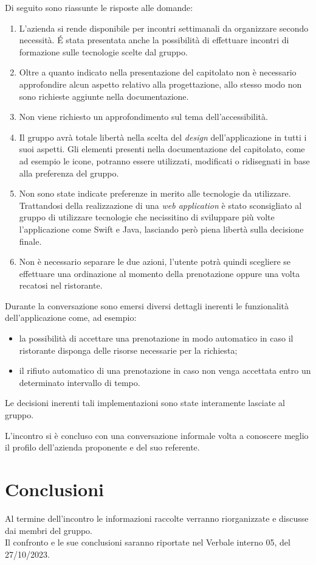 \noindent
Di seguito sono riassunte le risposte alle domande:
\begin{enumerate}
	\item L'azienda si rende disponibile per incontri settimanali da organizzare secondo necessità. \'E stata presentata anche la possibilità di effettuare incontri di formazione sulle tecnologie scelte dal gruppo.
	\item Oltre a quanto indicato nella presentazione del capitolato non è necessario approfondire alcun aspetto relativo alla progettazione, allo stesso modo non sono richieste aggiunte nella documentazione.
	\item Non viene richiesto un approfondimento sul tema dell'accessibilità.
	\item Il gruppo avrà totale libertà nella scelta del \textit{design} dell'applicazione in tutti i suoi aspetti. Gli elementi presenti nella documentazione del capitolato, come ad esempio le icone, potranno essere utilizzati, modificati o ridisegnati in base alla preferenza del gruppo.
	\item Non sono state indicate preferenze in merito alle tecnologie da utilizzare. Trattandosi della realizzazione di una \textit{web application} è stato sconsigliato al gruppo di utilizzare tecnologie che necissitino di sviluppare più volte l'applicazione come Swift e Java, lasciando però piena libertà sulla decisione finale.
	\item Non è necessario separare le due azioni, l'utente potrà quindi scegliere se effettuare una ordinazione al momento della prenotazione oppure una volta recatosi nel ristorante. 
\end{enumerate}
Durante la conversazione sono emersi diversi dettagli inerenti le funzionalità dell'applicazione come, ad esempio:
\begin{itemize}
	\item la possibilità di accettare una prenotazione in modo automatico in caso il ristorante disponga delle risorse necessarie per la richiesta;
	\item il rifiuto automatico di una prenotazione in caso non venga accettata entro un determinato intervallo di tempo.
\end{itemize} 
Le decisioni inerenti tali implementazioni sono state interamente lasciate al gruppo.

\noindent
L'incontro si è concluso con una conversazione informale volta a conoscere meglio il profilo dell'azienda proponente e del suo referente.


\section{Conclusioni}
Al termine dell'incontro le informazioni raccolte verranno riorganizzate e discusse dai membri del gruppo. \\
Il confronto e le sue conclusioni saranno riportate nel Verbale interno 05, del 27/10/2023.


